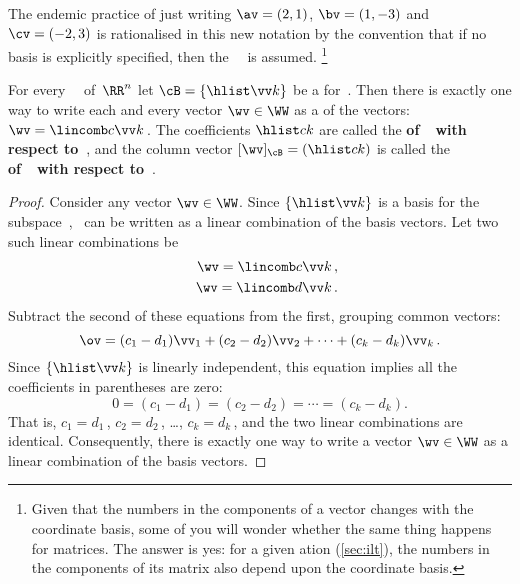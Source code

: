 \begin{example}
The endemic practice of just writing \(\av=(2,1)\), \(\bv=(1,-3)\) and \(\cv=(-2,3)\) is rationalised in this new notation by the convention that if no basis is explicitly specified, then the ~\cE\ is assumed.
\footnote{Given that the numbers in the components of a vector changes with the coordinate basis, some of you will wonder whether the same thing happens for matrices.  
The answer is yes:  for a given ation (\autoref{sec:ilt}), the numbers in the components of its matrix also depend upon the coordinate basis. }
\end{example}



\begin{theorem} \label{thm:ssbc} 
For every ~\WW\ of~\(\RR^n\) let \(\cB=\{\hlist\vv k\}\) be a  for~\WW.  
Then there is exactly one way to write each and every vector \(\wv\in\WW\) as a  of the  vectors: \(\wv=\lincomb c\vv k\)\,.
The coefficients \(\hlist ck\) are called the \textbf{ of~\wv\ with respect to~\cB}, and the column vector \([\wv]_{\cB}=(\hlist ck)\) is called the \textbf{ of~\wv\ with respect to~\cB}.
\end{theorem}
\begin{proof}  
Consider any vector \(\wv\in\WW\).
Since \(\{\hlist\vv k\}\) is a basis for the subspace~\WW, \wv~can be written as a linear combination of the basis vectors. 
Let two such linear combinations be
\begin{eqnarray*}&&
\wv=\lincomb c\vv k\,,
\\&&
\wv=\lincomb d\vv k\,.
\end{eqnarray*}
Subtract the second of these equations from the first, grouping common vectors:
\begin{equation*}
\ov=(c_1-d_1)\vv_1+(c_2-d_2)\vv_2+\cdots+(c_k-d_k)\vv_k\,.
\end{equation*}
Since \(\{\hlist\vv k\}\) is linearly independent, this equation implies all the coefficients in parentheses are zero:
\begin{equation*}
0=(c_1-d_1)=(c_2-d_2)=\cdots=(c_k-d_k).
\end{equation*}
That is, \(c_1=d_1\)\,, \(c_2=d_2\)\,, \ldots, \(c_k=d_k\)\,, and the two linear combinations are identical.
Consequently, there is exactly one way to write a vector \(\wv\in\WW\) as a {linear combination} of the {basis} vectors.
\end{proof}


